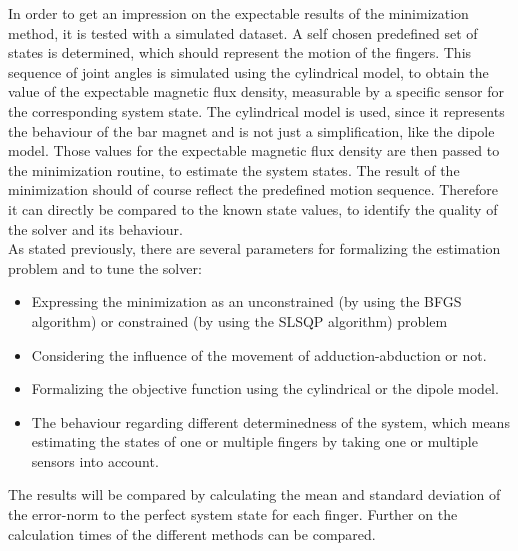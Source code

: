 In order to get an impression on the expectable results of the minimization method, it is tested with a simulated dataset. A self chosen predefined set of states is determined, which should represent the motion of the fingers. This sequence of joint angles is simulated using the cylindrical model, to obtain the value of the expectable magnetic flux density, measurable by a specific sensor for the corresponding system state. The cylindrical model is used, since it represents the behaviour of the bar magnet and is not just a simplification, like the dipole model. Those values for the expectable magnetic flux density are then passed to the minimization routine, to estimate the system states. The result of the minimization should of course reflect the predefined motion sequence. Therefore it can directly be compared to the known state values, to identify the quality of the solver and its behaviour.\\
As stated previously, there are several parameters for formalizing the estimation problem and to tune the solver:
\begin{itemize}
\item Expressing the minimization as an unconstrained (by using the \ac{BFGS} algorithm) or constrained (by using the \ac{SLSQP} algorithm) problem
\item Considering the influence of the movement of adduction-abduction or not.
\item Formalizing the objective function using the cylindrical or the dipole model.
\item The behaviour regarding different determinedness of the system, which means estimating the states of one or multiple fingers by taking one or multiple sensors into account.
\end{itemize}
The results will be compared by calculating the mean and standard deviation of the error-norm to the perfect system state for each finger. Further on the calculation times of the different methods can be compared.

